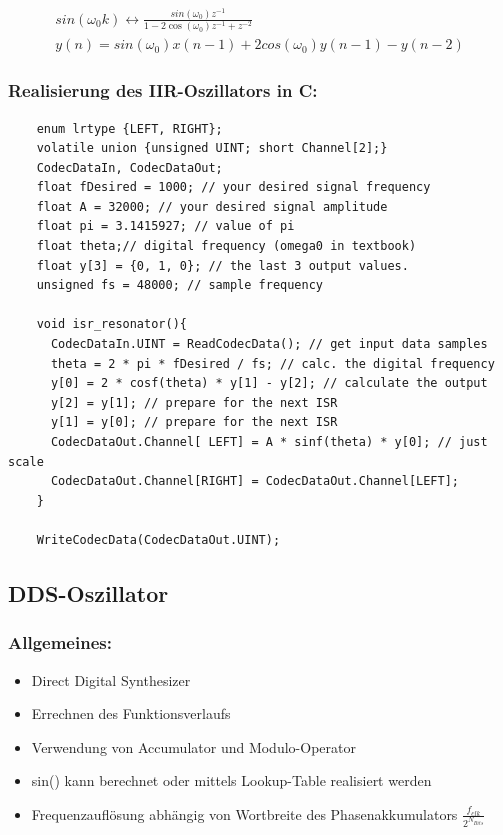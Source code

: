 \documentclass[10pt,a4paper]{article}
\begin{document}
  \begin{mdframed}[style=exercise]
    \begin{align}
    sin(\omega_0 k) \leftrightarrow \frac{sin(\omega_0)z^{-1}}{1-2\cos(\omega_0)z^{-1}+z^{-2}}\\
    y(n) = sin(\omega_0)x(n-1)+2cos(\omega_0)y(n-1)-y(n-2)
    \end{align}
  \end{mdframed}

\subsubsection{Realisierung des IIR-Oszillators in C:}
  \begin{verbatim}
    enum lrtype {LEFT, RIGHT};
    volatile union {unsigned UINT; short Channel[2];}
    CodecDataIn, CodecDataOut;
    float fDesired = 1000; // your desired signal frequency
    float A = 32000; // your desired signal amplitude
    float pi = 3.1415927; // value of pi
    float theta;// digital frequency (omega0 in textbook)
    float y[3] = {0, 1, 0}; // the last 3 output values.
    unsigned fs = 48000; // sample frequency

    void isr_resonator(){
      CodecDataIn.UINT = ReadCodecData(); // get input data samples
      theta = 2 * pi * fDesired / fs; // calc. the digital frequency
      y[0] = 2 * cosf(theta) * y[1] - y[2]; // calculate the output
      y[2] = y[1]; // prepare for the next ISR
      y[1] = y[0]; // prepare for the next ISR
      CodecDataOut.Channel[ LEFT] = A * sinf(theta) * y[0]; // just scale
      CodecDataOut.Channel[RIGHT] = CodecDataOut.Channel[LEFT];
    }

    WriteCodecData(CodecDataOut.UINT);  
  \end{verbatim}

\subsection{DDS-Oszillator}
\subsubsection{Allgemeines:}
\begin{itemize}
  \item Direct Digital Synthesizer
  \item Errechnen des Funktionsverlaufs
  \item Verwendung von Accumulator und Modulo-Operator
  \item sin() kann berechnet oder mittels Lookup-Table realisiert werden
  \item Frequenzauflösung abhängig von Wortbreite des Phasenakkumulators $\frac{f_{clk}}{2^{N_{Bits}}}$
\end{itemize}
\end{document}
